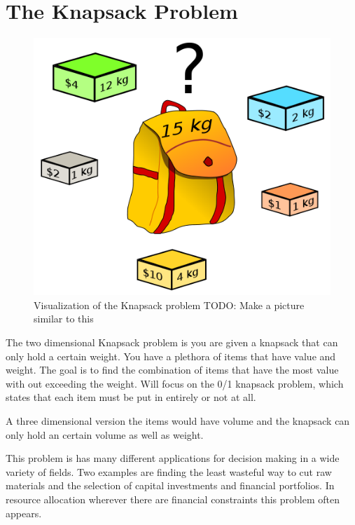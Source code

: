 \label{Ch:Knapsack}


\section*{The Knapsack Problem}


\begin{figure}[H]
\includegraphics[scale = .3]{Knapsack.png}
\caption{Visualization of the Knapsack problem TODO: Make a picture similar to this}
\end{figure}

The two dimensional Knapsack problem is you are given a knapsack that can only hold a certain weight. You have a plethora of items that have value and weight. The goal is to find the combination of items that have the most value with out exceeding the weight. Will focus on the 0/1 knapsack problem, which states that each item must be put in entirely or not at all.

A three dimensional version the items would have volume and the knapsack can only hold an certain volume as well as weight. 

This problem is has many different applications for decision making in a wide variety of fields. Two examples are finding the least wasteful way to cut raw materials and the selection of capital investments and financial portfolios. In resource allocation wherever there are financial constraints this problem often appears. 
  

